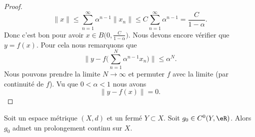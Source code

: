 \begin{proof}
\begin{equation}
		\| x \|\leq\sum_{n=1}^{\infty}\alpha^{n-1}\| x_n \|\leq C\sum_{n=1}^{\infty}\alpha^{n-1}=\frac{ C }{ 1-\alpha }.
	\end{equation}
	Donc c'est bon pour avoir \( x\in B\big( 0,\frac{ C }{ 1-\alpha } \big)\). Nous devons encore vérifier que \( y=f(x)\). Pour cela nous remarquons que
	\begin{equation}
		\| y-f\Big( \sum_{n=1}^N\alpha^{n-1}x_n \Big) \|\leq \alpha^N.
	\end{equation}
	Nous pouvons prendre la limite \( N\to \infty\) et permuter \( f\) avec la limite (par continuité de \( f\)). Vu que \( 0<\alpha<1\) nous avons
	\begin{equation}
		\| y-f(x) \|=0.
	\end{equation}
\end{proof}

\begin{theorem}   \label{ThoFFQooGvcLzJ}
	Soit un espace métrique \( (X,d)\) et un fermé \( Y\subset X\). Soit \( g_0\in C^0(Y,\eR)\). Alors \( g_0\) admet un prolongement continu sur \( X\).
\end{theorem}

